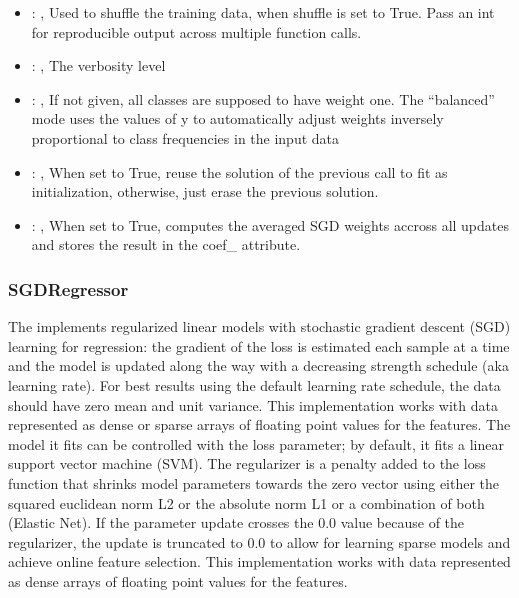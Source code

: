 \begin{itemize}
    \item {}: ,
      Used to shuffle the training data, when shuffle is set to
      True. Pass an int for reproducible output across multiple function calls.

    \item {}: ,
      The verbosity level

    \item {}: \xmlDesc{[balanced]},
      If not given, all classes are supposed to have weight one.
      The “balanced” mode uses the values of y to automatically adjust weights
      inversely proportional to class frequencies in the input data

    \item {}: ,
      When set to True, reuse the solution of the previous call
      to fit as initialization, otherwise, just erase the previous solution.

    \item {}: ,
      When set to True, computes the averaged SGD weights accross
      all updates and stores the result in the coef\_ attribute.
  \end{itemize}


\subsubsection{SGDRegressor}
  The  implements regularized linear models with stochastic
  gradient descent (SGD) learning for regression: the gradient of the loss is estimated each sample
  at                         a time and the model is updated along the way with a decreasing
  strength schedule                         (aka learning rate). For best results using the default
  learning rate schedule, the                         data should have zero mean and unit variance.
  This implementation works with data represented as dense or sparse arrays of floating
  point values for the features. The model it fits can be controlled with the loss parameter;
  by default, it fits a linear support vector machine (SVM).                         The regularizer
  is a penalty added to the loss function that shrinks model parameters towards
  the zero vector using either the squared euclidean norm L2 or the absolute norm L1 or a
  combination of both (Elastic Net). If the parameter update crosses the 0.0 value because
  of the regularizer, the update is truncated to $0.0$ to allow for learning sparse models and
  achieve online feature selection.                         This implementation works with data
  represented as dense arrays of floating point values for the features.

